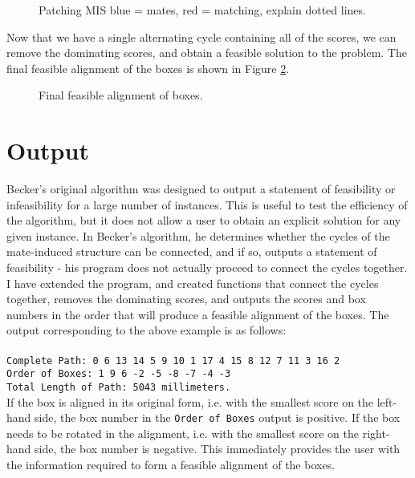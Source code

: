 \documentclass[a4paper, 11pt, twoside, onecolumn, openany]{article}
\newcommand{\code}[1]{\colorbox{light-gray}{\texttt{#1}}}
\begin{document}
\begin{figure}[!htb]
	\centering
	
	\caption{Patching MIS blue = mates, red = matching, explain dotted lines.}
	\label{fig:patch}	
\end{figure}


Now that we have a single alternating cycle containing all of the scores, we can remove the dominating scores, and obtain a feasible solution to the problem. The final feasible alignment of the boxes is shown in Figure \ref{fig:path}.


\begin{figure}[!htb]
	\centering
	
	\caption{Final feasible alignment of boxes.}	
	\label{fig:path}
\end{figure}

\section{Output}
Becker's original algorithm was designed to output a statement of feasibility or infeasibility for a large number of instances. This is useful to test the efficiency of the algorithm, but it does not allow a user to obtain an explicit solution for any given instance. In Becker's algorithm, he determines whether the cycles of the mate-induced structure can be connected, and if so, outputs a statement of feasibility - his program does not actually proceed to connect the cycles together. I have extended the program, and created functions that connect the cycles together, removes the dominating scores, and outputs the scores and box numbers in the order that will produce a feasible alignment of the boxes. The output corresponding to the above example is as follows:\\
\\
\code{Complete Path: 0 6 13 14 5 9 10 1 17 4 15 8 12 7 11 3 16 2}\\
\code{Order of Boxes: 1 9 6 -2 -5 -8 -7 -4 -3}\\
\code{Total Length of Path: 5043 millimeters.}\\

If the box is aligned in its original form, i.e. with the smallest score on the left-hand side, the box number in the \texttt{Order of Boxes} output is positive. If the box needs to be rotated in the alignment, i.e. with the smallest score on the right-hand side, the box number is negative. This immediately provides the user with the information required to form a feasible alignment of the boxes.
\end{document}
